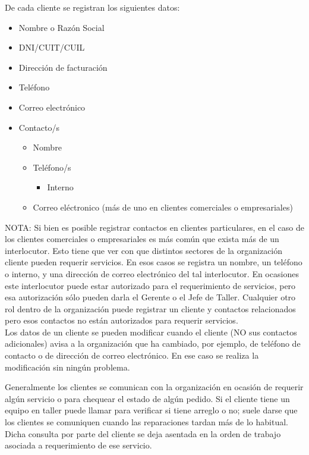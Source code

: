 \documentclass[12pt]{extarticle}
\begin{document}
\begin{spacing}{1.2}
    De cada cliente se registran los siguientes datos:
    \begin{itemize}
        \item Nombre o Razón Social
        \item DNI/CUIT/CUIL
        \item Dirección de facturación
        \item Teléfono
        \item Correo electrónico
        \item Contacto/s
        	\begin{itemize}
				\item Nombre	
		        \item Teléfono/s
		        \begin{itemize}
			        \item Interno	        
		        \end{itemize}
		        \item Correo eléctronico (más de uno en clientes comerciales o empresariales)\\        	
        	\end{itemize}
    \end{itemize}

        NOTA: Si bien es posible registrar contactos en clientes particulares, en el caso de los clientes comerciales o empresariales es más común que exista más de un interlocutor. Esto tiene que ver con que distintos sectores de la organización cliente pueden requerir servicios. En esos casos se registra un nombre, un teléfono o interno, y una dirección de correo electrónico del tal interlocutor. En ocasiones este interlocutor puede estar autorizado para el requerimiento de servicios, pero esa autorización sólo pueden darla el Gerente o el Jefe de Taller. Cualquier otro rol dentro de la organización puede registrar un cliente y contactos relacionados pero esos contactos no están autorizados para requerir servicios. \\

    Los datos de un cliente se pueden modificar cuando el cliente (NO sus contactos adicionales) avisa a la organización que ha cambiado, por ejemplo, de teléfono de contacto o de dirección de correo electrónico. En ese caso se realiza la modificación sin ningún problema.

    Generalmente los clientes se comunican con la organización en ocasión de requerir algún servicio o para chequear el estado de algún pedido. Si el cliente tiene un equipo en taller puede llamar para verificar si tiene arreglo o no; suele darse que los clientes se comuniquen cuando las reparaciones tardan más de lo habitual. Dicha consulta por parte del cliente se deja asentada en la orden de trabajo asociada a requerimiento de ese servicio.\\


\end{spacing}
\end{document}
